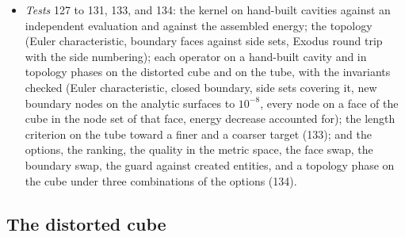\documentclass[11pt]{article}
\newcommand{\code}[1]{\texttt{#1}}
\begin{document}
\begin{itemize}[itemsep=2pt]
  adjacency layers; swaps in decreasing order of ring energy with
  deferral of cavities changed earlier in the pass; with a prescribed
  target the edges outside the band $[1/\sqrt2, \sqrt2]$ collapsed or
  split in every pass (before the swaps with \code{size operations
  first}, the splits longest first in the target), and shape-driven
  collapses and splits only in a pass without accepted swaps unless
  \code{shape operations every pass}; no operation may create an edge or
  a face that exists or was created earlier in the pass; compaction after
  every operator; refused proposals remembered for the phase and retried
  only when their cavity changes; passes until none accepts or a cap; the adapted mesh written (as
  \code{<output name>-adapted-<k>.g}) and smoothed again until a topology
  phase accepts nothing or the outer iterations are exhausted, the outputs of
  the smoothing phases after the first written with the suffixes
  \code{-s\_0002}, \code{-s\_0003}, and so on, and their times continued from
  one file to the next, so that ParaView opens them as one sequence. The smoothing phases end on the energy stagnation exit of
  the solver (\code{energy stagnation window} and \code{tolerance}).
  Input: the top-level \code{adaptivity} block
  (\code{docs/src/reference/model.md}).
\item \emph{Tests} 127 to 131, 133, and 134: the kernel on hand-built cavities against
  an independent evaluation and against the assembled energy; the
  topology (Euler characteristic, boundary faces against side sets,
  Exodus round trip with the side numbering); each operator on a
  hand-built cavity and in topology phases on the distorted cube and on
  the tube, with the invariants checked (Euler characteristic, closed
  boundary, side sets covering it, new boundary nodes on the analytic
  surfaces to $10^{-8}$, every node on a face of the cube in the node set
  of that face, energy decrease accounted for); the length criterion on
  the tube toward a finer and a coarser target (133); and the options,
  the ranking, the quality in the metric space, the face swap, the
  boundary swap, the guard against created entities, and a topology phase
  on the cube under three combinations of the options (134).
\end{itemize}

\subsection{The distorted cube}
\end{document}
